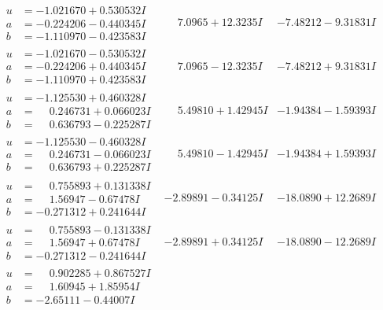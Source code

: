 \documentclass[1p]{elsarticle_modified}
\theoremstyle{definition}
\begin{document}
$$\begin{array}{c|c|c}
\begin{aligned}
u &= -1.021670 + 0.530532 I \\
a &= -0.224206 - 0.440345 I \\
b &= -1.110970 - 0.423583 I\end{aligned}
 & \phantom{-}7.0965 + 12.3235 I & -7.48212 - 9.31831 I \\ \hline\begin{aligned}
u &= -1.021670 - 0.530532 I \\
a &= -0.224206 + 0.440345 I \\
b &= -1.110970 + 0.423583 I\end{aligned}
 & \phantom{-}7.0965 - 12.3235 I & -7.48212 + 9.31831 I \\ \hline\begin{aligned}
u &= -1.125530 + 0.460328 I \\
a &= \phantom{-}0.246731 + 0.066023 I \\
b &= \phantom{-}0.636793 - 0.225287 I\end{aligned}
 & \phantom{-}5.49810 + 1.42945 I & -1.94384 - 1.59393 I \\ \hline\begin{aligned}
u &= -1.125530 - 0.460328 I \\
a &= \phantom{-}0.246731 - 0.066023 I \\
b &= \phantom{-}0.636793 + 0.225287 I\end{aligned}
 & \phantom{-}5.49810 - 1.42945 I & -1.94384 + 1.59393 I \\ \hline\begin{aligned}
u &= \phantom{-}0.755893 + 0.131338 I \\
a &= \phantom{-}1.56947 - 0.67478 I \\
b &= -0.271312 + 0.241644 I\end{aligned}
 & -2.89891 - 0.34125 I & -18.0890 + 12.2689 I \\ \hline\begin{aligned}
u &= \phantom{-}0.755893 - 0.131338 I \\
a &= \phantom{-}1.56947 + 0.67478 I \\
b &= -0.271312 - 0.241644 I\end{aligned}
 & -2.89891 + 0.34125 I & -18.0890 - 12.2689 I \\ \hline\begin{aligned}
u &= \phantom{-}0.902285 + 0.867527 I \\
a &= \phantom{-}1.60945 + 1.85954 I \\
b &= -2.65111 - 0.44007 I\end{aligned}

\end{array}$$
\end{document}
